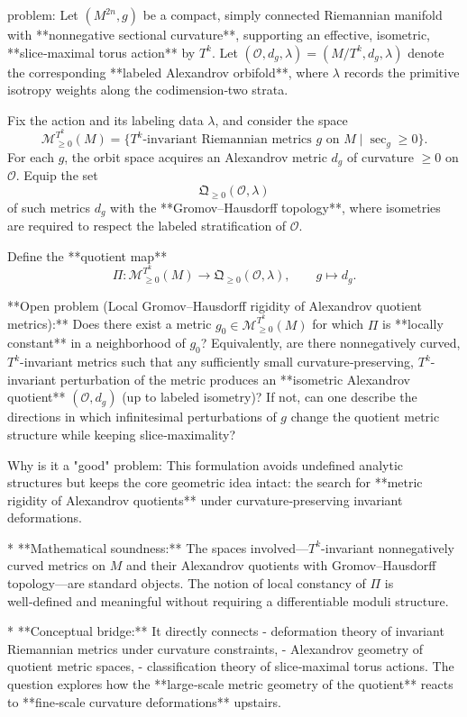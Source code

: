 problem:  
Let \( (M^{2n}, g) \) be a compact, simply connected Riemannian manifold with **nonnegative sectional curvature**, supporting an effective, isometric, **slice‑maximal torus action** by \(T^k\).  
Let \( (\mathcal{O}, d_g, \lambda) = (M/T^k, d_g, \lambda) \) denote the corresponding **labeled Alexandrov orbifold**, where \(\lambda\) records the primitive isotropy weights along the codimension‑two strata.

Fix the action and its labeling data \(\lambda\), and consider the space  
\[
\mathcal{M}_{\ge 0}^{T^k}(M) = \{ T^k\text{-invariant Riemannian metrics } g \text{ on } M \mid \sec_g \ge 0 \}.
\]
For each \(g\), the orbit space acquires an Alexandrov metric \(d_g\) of curvature \(\ge 0\) on \(\mathcal{O}\). Equip the set  
\[
\mathfrak{Q}_{\ge 0}(\mathcal{O}, \lambda)
\]
of such metrics \(d_g\) with the **Gromov–Hausdorff topology**, where isometries are required to respect the labeled stratification of \(\mathcal{O}\).

Define the **quotient map**
\[
\Pi: \mathcal{M}_{\ge 0}^{T^k}(M) \longrightarrow \mathfrak{Q}_{\ge 0}(\mathcal{O}, \lambda), \qquad g \mapsto d_g.
\]

**Open problem (Local Gromov–Hausdorff rigidity of Alexandrov quotient metrics):**  
Does there exist a metric \(g_0 \in \mathcal{M}_{\ge0}^{T^k}(M)\) for which \(\Pi\) is **locally constant** in a neighborhood of \(g_0\)?  
Equivalently, are there nonnegatively curved, \(T^k\)-invariant metrics such that any sufficiently small curvature‑preserving, \(T^k\)-invariant perturbation of the metric produces an **isometric Alexandrov quotient** \((\mathcal{O}, d_g)\) (up to labeled isometry)?  
If not, can one describe the directions in which infinitesimal perturbations of \(g\) change the quotient metric structure while keeping slice‑maximality?

Why is it a "good" problem:  
This formulation avoids undefined analytic structures but keeps the core geometric idea intact: the search for **metric rigidity of Alexandrov quotients** under curvature‑preserving invariant deformations.

* **Mathematical soundness:** The spaces involved—\(T^k\)-invariant nonnegatively curved metrics on \(M\) and their Alexandrov quotients with Gromov–Hausdorff topology—are standard objects. The notion of local constancy of \(\Pi\) is well‑defined and meaningful without requiring a differentiable moduli structure.

* **Conceptual bridge:** It directly connects
  - deformation theory of invariant Riemannian metrics under curvature constraints,
  - Alexandrov geometry of quotient metric spaces,
  - classification theory of slice‑maximal torus actions.
  The question explores how the **large‑scale metric geometry of the quotient** reacts to **fine‑scale curvature deformations** upstairs.

